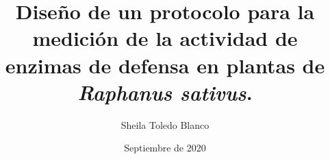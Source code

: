 \documentclass[12pt, a4paper]{uhthesis}
\title{Dise\~no de un protocolo para la medici\'on de la actividad de enzimas de defensa en plantas de \textit{Raphanus sativus}.} %
\author{ Sheila Toledo Blanco }
\date{Septiembre de 2020}
\begin{document}
\frontmatter

\maketitle






\tableofcontents 
{}
\clearpage

\mainmatter










\backmatter

\renewcommand{\bibname}{Literatura Citada}



\renewcommand{\figurename}{Figura}


%
\end{document}
